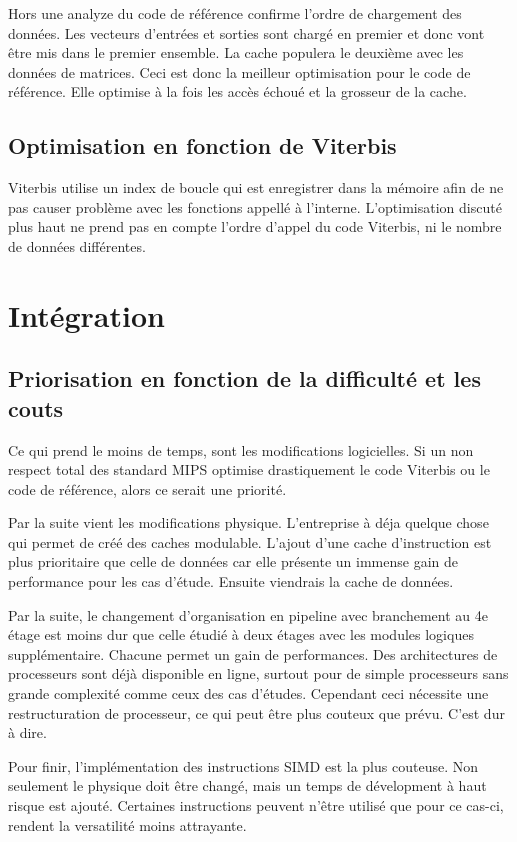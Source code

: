 \documentclass[a11paper]{article}
\newcommand{\todo}[1]{\begin{color}{Red}\textbf{TODO:} #1\end{color}}
\begin{document}
Hors une analyze du code de référence confirme l'ordre de chargement des
données. Les vecteurs d'entrées et sorties sont chargé en premier et donc
vont être mis dans le premier ensemble. La cache populera le deuxième avec
les données de matrices. Ceci est donc la meilleur optimisation pour le code de
référence. Elle optimise à la fois les accès échoué et la grosseur de la cache.

\subsection{Optimisation en fonction de Viterbis}
Viterbis utilise un index de boucle qui est enregistrer dans la mémoire afin de
ne pas causer problème avec les fonctions appellé à l'interne. L'optimisation
discuté plus haut ne prend pas en compte l'ordre d'appel du code Viterbis, ni
le nombre de données différentes.

\section{Intégration}

\subsection{Priorisation en fonction de la difficulté et les couts}
Ce qui prend le moins de temps, sont les modifications logicielles. Si un non
respect total des standard MIPS optimise drastiquement le code Viterbis ou le
code de référence, alors ce serait une priorité.

Par la suite vient les modifications physique. L'entreprise à déja quelque
chose qui permet de créé des caches modulable. L'ajout d'une cache
d'instruction est plus prioritaire que celle de données car elle présente un
immense gain de performance pour les cas d'étude. Ensuite viendrais la cache
de données.

Par la suite, le changement d'organisation en pipeline avec branchement au 4e
étage est moins dur que celle étudié à deux étages avec les modules logiques
supplémentaire. Chacune permet un gain de performances. Des architectures de
processeurs sont déjà disponible en ligne, surtout pour de simple processeurs
sans grande complexité comme ceux des cas d'études. Cependant ceci nécessite
une restructuration de processeur, ce qui peut être plus couteux que prévu.
C'est dur à dire.

Pour finir, l'implémentation des instructions SIMD est la plus couteuse.
Non seulement le physique doit être changé, mais un temps de dévelopment à
haut risque est ajouté. Certaines instructions peuvent n'être utilisé que pour
ce cas-ci, rendent la versatilité moins attrayante.
\end{document}
